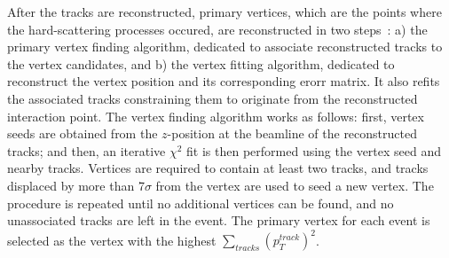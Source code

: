 After the tracks are reconstructed, primary vertices,
which are the points where the hard-scattering processes occured,
are reconstructed in two steps~\cite{ATLAS-CONF-2010-069}:
a) the primary vertex finding algorithm, 
dedicated to associate reconstructed tracks to the vertex candidates, 
and b) the vertex fitting algorithm, 
dedicated to reconstruct the vertex position and 
its corresponding erorr matrix. 
It also refits the associated
tracks constraining them to originate 
from the reconstructed interaction point.
The vertex finding algorithm works as follows:
first, vertex seeds are obtained from the $z$-position 
at the beamline of the reconstructed tracks; 
and then, an iterative $\chi^2$ fit is then performed 
using the vertex seed and nearby tracks. 
Vertices are required to contain at least two tracks, and 
tracks displaced by more than 7$\sigma$ from the vertex are used to
seed a new vertex.  The procedure is repeated 
until no additional vertices can be found, 
and no unassociated tracks are left in the event.
The primary vertex for each event is selected as the vertex with the highest
$\sum_{tracks}(p_T^{track})^2$.


